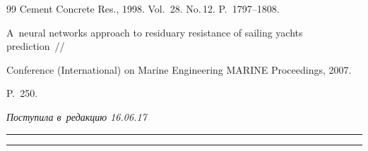 {{\begin{thebibliography}{99}
   Cement Concrete Res., 1998. Vol.~28. No.\,12. P.~1797--1808.

    



A~neural networks approach to residuary resistance of sailing yachts prediction~/\!\!/ 

 Conference (International) on Marine Engineering MARINE Proceedings, 2007.  

 P.~250.

         \end{thebibliography}

} }





\vspace*{-6pt}



\hfill{\small\textit{Поступила в~редакцию 16.06.17}}









\vspace*{4pt}



\hrule



\vspace*{2pt}









\hrule










\def\tit{GENERATION OF EXPERTLY-INTERPRETED MODELS FOR~PREDICTION OF~CORE PERMEABILITY}



\def\titkol{Generation of expertly-interpreted models for~prediction of~core permeability}





\def\aut{А.\,М.~Bochkarev$^1$, I.\,L.~Sofronov$^1$, and~V.\,V.~Strijov$^2$}

